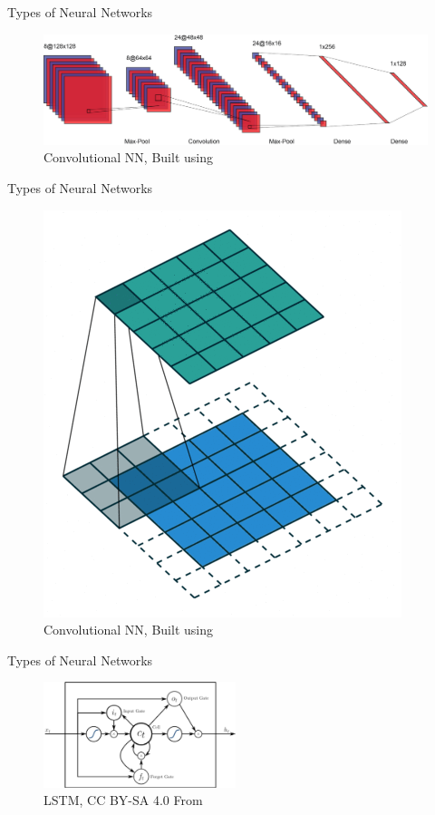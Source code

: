 \documentclass[10pt]{beamer}
\begin{document}
\begin{frame}{Types of Neural Networks}
	\begin{figure}	
		\caption{Convolutional NN, {\tiny Built using \href{http://alexlenail.me/NN-SVG/index.html}{}}}
		\includegraphics[width=1.0 \textwidth, trim=0cm 0cm 0 0cm]{images/CNN.pdf}
	\end{figure}
\end{frame}

\begin{frame}{Types of Neural Networks}
	\begin{figure}	
		\caption{Convolutional NN, {\tiny Built using \href{https://github.com/vdumoulin/conv_arithmetic}{}}}
		\includegraphics[width=0.6 \textwidth, trim=0cm 0cm 0 0cm]{images/same_padding_no_strides-1.png}
	\end{figure}
\end{frame}

\begin{frame}{Types of Neural Networks}
	\begin{figure}	
		\caption{LSTM, {\tiny CC BY-SA 4.0 From \href{https://en.wikipedia.org/wiki/Long_short-term_memory}{}}}
		\includegraphics[width=0.5\textwidth, trim=0cm 0cm 0 0cm]{images/542px-Peephole_Long_Short-Term_Memory.pdf}
	\end{figure}
\end{frame}
\end{document}
